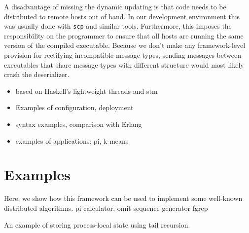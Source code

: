\documentclass[preprint]{sigplanconf}
\begin{document}
A disadvantage of missing the dynamic updating is that code needs to be distributed to remote hosts out of band. In our development environment this was usually done with \texttt{scp} and similar tools. Furthermore, this imposes the responsibility on the programmer to ensure that all hosts are running the same version of the compiled executable. Because we don't make any framework-level provision for rectifying incompatible message types, sending messages between executables that share message types with different structure would most likely crash the deserializer.

\begin{itemize}
\item based on Haskell's lightweight threads  and stm
\item Examples of configuration, deployment
\item syntax examples, comparison with Erlang
\item examples of applications: pi, k-means
\end{itemize}


\section{Examples}
Here, we show how this framework can be used to implement some well-known distributed algorithms.
pi calculator, omit sequence generator
fgrep


An example of storing process-local state using tail recursion.
\end{document}
